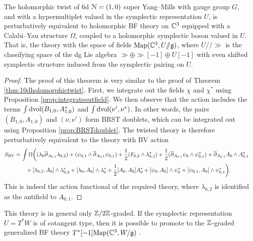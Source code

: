 \documentclass[10pt, oneside]{article}
\newcommand{\ham}{/\!\!/}
\begin{document}
\begin{thm}
The holomorphic twist of 6d $\mathcal{N}=(1, 0)$ super Yang--Mills with gauge group $G$, and with a hypermultiplet valued in the symplectic representation $U$, is perturbatively equivalent to holomorphic BF theory on $\mathbb C^3$ equipped with a Calabi--Yau structure $\Omega$, coupled to a holomorphic symplectic boson valued in $U$.  That is, the theory with the space of fields $\mr{Map}(\CC^3, U\ham \gg)$, where $U\ham \gg$ is the classifying space of the dg Lie algebra $\gg \oplus \gg[-1] \oplus U[-1]$ with even shifted symplectic structure induced from the symplectic pairing on $U$. 
\label{thm:6dholomorphictwist}
\end{thm}

\begin{proof}
The proof of this theorem is very similar to the proof of Theorem \ref{thm:10dholomorphictwist}.  First, we integrate out the fields $\chi$ and $\chi^*$ using Proposition \ref{prop:integrateoutfield}.  We then observe that the action includes the terms $\int \operatorname{dvol}  (B_{1,0}, A_{1,0}^*)$ and  $\int \operatorname{dvol} (\nu', \nu^*)$.  In other words, the pairs $(B_{1,0}, A_{1,0})$ and $(\nu, \nu')$ form BRST doublets, which can be integrated out using Proposition \ref{prop:BRSTdoublet}.  The twisted theory is therefore perturbatively equivalent to the theory with BV action 
\begin{align*}
 S_{\mathrm{BV}} &= \int \Omega \bigg( (\lambda_0 \overline{\partial}_{A_{0,1}} \lambda_{0,2})  + (\psi_{0,1} \wedge \overline{\partial}_{A_{0,1}} \psi_{0,1}) + \frac 12 (F_{0,2} \wedge \lambda_{0,2}^*) + \frac 12( \overline{\partial}_{A_{0,1}} \psi_0 \wedge \psi_{0,1}^*) +  \overline{\partial}_{A_{0, 1}} A_0\wedge A_{0, 1}^* \\ 
  &\qquad  + [\lambda_{0,2}, A_0]\wedge \lambda_{0,2}^* + [\lambda_{0}, A_0]\wedge \lambda_{0}^* + \frac{1}{2}[A_0, A_0]A_0^* +  [\psi_{0}, A_0]\wedge \psi_{0}^* + [\psi_{0,1}, A_0]\wedge \psi_{0,1}^*  \bigg).
\end{align*}
This is indeed the action functional of the required theory, where $\lambda_{0,2}$ is identified as the antifield to $A_{0,1}$.
\end{proof}

\begin{remark} \label{6d_BF_remark}
This theory is in general only $\mathbb Z/2\mathbb Z$-graded.  If the symplectic representation $U = T^*W$ is of cotangent type, then it is possible to promote to the $\mathbb Z$-graded generalized BF theory $T^*[-1]\mathrm{Map}(\mathbb C^3, W/\mathfrak{g})$ .
\end{remark}
\end{document}
